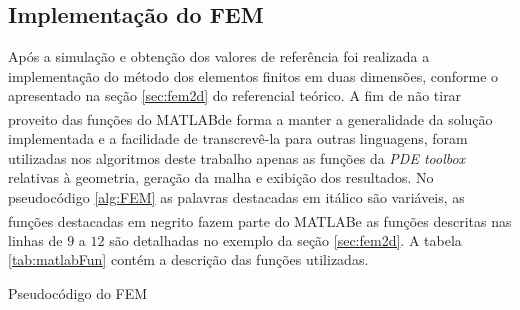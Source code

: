 \documentclass[
    12pt,               %
    openright,          %
    oneside,
    a4paper,            %
    english,            %
    french,             %
    spanish,            %
    brazil              %
    ]{abntex2}
\newcommand{\matlab}{MATLAB\textsuperscript{\textregistered}}
\begin{document}
\subsection{Implementação do FEM}
Após a simulação e obtenção dos valores de referência foi realizada a implementação do método dos elementos finitos em duas dimensões, conforme o apresentado na seção \ref{sec:fem2d} do referencial teórico.
A fim de não tirar proveito das funções do \matlab de forma a manter a generalidade da solução implementada e a facilidade de transcrevê-la para outras linguagens, foram utilizadas nos algoritmos deste trabalho apenas as funções da \textit{PDE toolbox} relativas à geometria, geração da malha e exibição dos resultados. No pseudocódigo \ref{alg:FEM} as palavras destacadas em itálico são variáveis, as funções destacadas em negrito fazem parte do \matlab e as funções descritas nas linhas de $9$ a $12$ são detalhadas no exemplo da seção \ref{sec:fem2d}. A tabela \ref{tab:matlabFun} contém a descrição das funções utilizadas.

\begin{algorithm}	
	\caption{\label{alg:FEM}Pseudocódigo do FEM} 
	\begin{algorithmic}[1]
	\end{algorithmic}
\end{algorithm}
\end{document}
